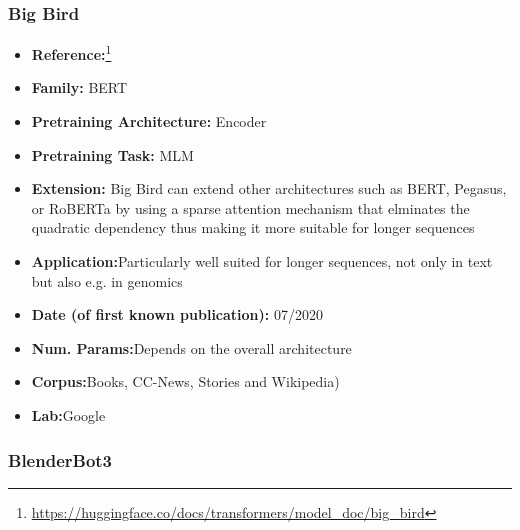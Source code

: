 \documentclass{article}
\begin{document}
\subsubsection{Big Bird}

            \begin{itemize}
                \item \textbf{Reference:}\footnote{\url{https://huggingface.co/docs/transformers/model_doc/big_bird}}\cite{zaheer2020big}
                \item \textbf{Family:} BERT 
                \item \textbf{Pretraining Architecture:} Encoder
                \item \textbf{Pretraining Task:} MLM
                \item \textbf{Extension:} Big Bird can extend other architectures such as BERT, Pegasus, or RoBERTa by using a sparse attention mechanism that elminates the quadratic dependency thus making it more suitable for longer sequences 
                \item \textbf{Application:}Particularly well suited for longer sequences, not only in text but also e.g. in genomics
                \item \textbf{Date (of first known publication):} 07/2020
                \item \textbf{Num. Params:}Depends on the overall architecture
                \item \textbf{Corpus:}Books, CC-News, Stories and Wikipedia)
                \item \textbf{Lab:}Google
            \end{itemize}

\subsubsection{BlenderBot3}
\end{document}
